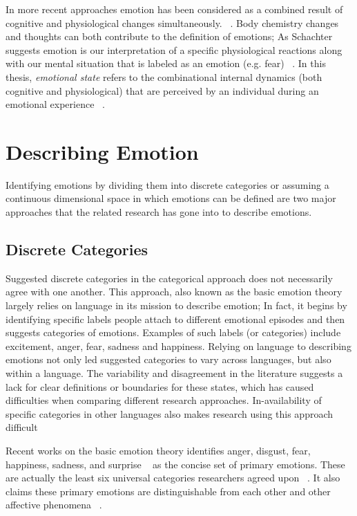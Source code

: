 In more recent approaches emotion has been considered as a combined result of cognitive and physiological changes simultaneously. ~\cite{paiva2007affective}. Body chemistry changes and thoughts can both contribute to the definition of emotions; As Schachter suggests emotion is our interpretation of a specific physiological reactions along with our mental situation that is labeled as an emotion (e.g. fear) ~\cite{schachter1964interaction}. In this thesis, \textit{emotional state} refers to the combinational internal dynamics (both cognitive and physiological) that are perceived by an individual during an emotional experience ~\cite{paiva2007affective}.

\section{Describing Emotion}

Identifying emotions by dividing them into discrete categories or assuming a continuous dimensional space in which emotions can be defined are two major approaches that the related research has gone into to describe emotions.

\subsection{Discrete Categories}

Suggested discrete categories in the categorical approach does not necessarily agree with one another. This approach, also known as the basic emotion theory largely relies on language in its mission to describe emotion; In fact, it begins by identifying specific labels people attach to different emotional episodes and then suggests categories of emotions. Examples of such labels (or categories) include excitement, anger, fear, sadness and happiness. Relying on language to describing emotions not only led suggested categories to vary across languages, but also within a language. The variability and disagreement in the literature suggests a lack for clear definitions or boundaries for these states, which has caused difficulties when comparing different research approaches. In-availability of specific categories in other languages also makes research using this approach difficult ~\cite{zimmermann2006extending}

Recent works on the basic emotion theory identifies anger, disgust, fear, happiness, sadness, and surprise ~\cite{peter2006emotion} as the concise set of primary emotions. These are actually the least six universal categories researchers agreed upon ~\cite{zagalo2004story}. It also claims these primary emotions are distinguishable from each other and other affective phenomena ~\cite{dalgleish1999handbook}.

